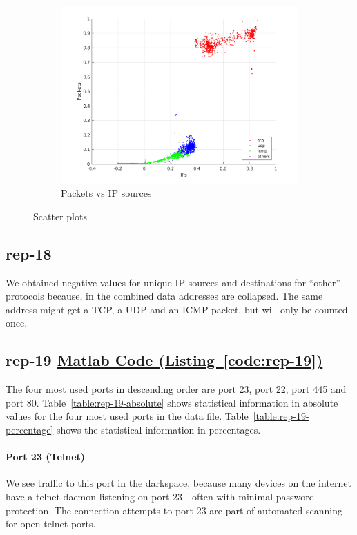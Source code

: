 \documentclass{article}
\newcommand{\codelink}[1]{%
    \hyperref[#1]{\quad\faArrowCircleRight\enskip Matlab Code (Listing~\ref{#1})}%
}
\begin{document}
\begin{figure}[h]
\begin{subfigure}{.5\textwidth}
        \includegraphics[width=\textwidth]{../exercise-3/plots/rep_17_optional_IPsPackets.png}
        \caption{Packets vs IP sources}
    \end{subfigure}
    \caption{\label{figure:rep-17-optional} Scatter plots}
\end{figure}

\subsection{rep-18}

We obtained negative values for unique IP sources and destinations for ``other'' protocols because, in
the combined data addresses are collapsed. The same address might get a TCP, a UDP and an ICMP packet, but
will only be counted once.

\subsection{rep-19 \codelink{code:rep-19}}

The four most used ports in descending order are port 23, port 22, port 445 and port 80.
Table~\ref{table:rep-19-absolute} shows statistical information in absolute values for the
four most used ports in the data file. Table~\ref{table:rep-19-percentage} shows the statistical
information in percentages.

\paragraph{Port 23 (Telnet)}
We see traffic to this port in the darkspace, because many devices on the internet have a
telnet daemon listening on port 23 - often with minimal password protection. The connection
attempts to port 23 are part of automated scanning for open telnet ports.
\end{document}
